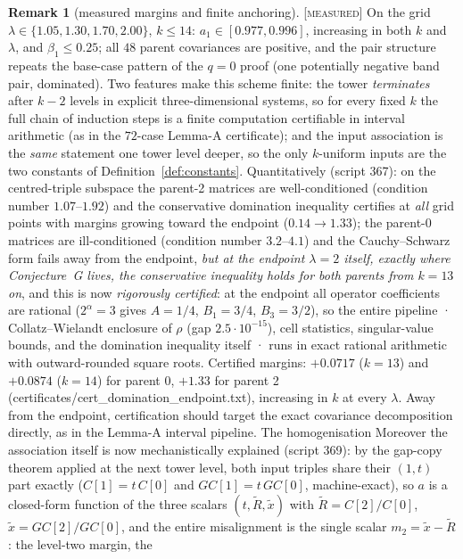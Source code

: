 \documentclass[11pt]{article}
\theoremstyle{definition}
\newtheorem{remark}[theorem]{Remark}
\newcommand{\MEASURED}{\textup{[\textsc{measured}]}}
\newcommand{\lam}{\lambda}
\begin{document}
\begin{remark}[measured margins and finite anchoring]\label{rem:anchoring}
\MEASURED{} On the grid $\lam \in \{1.05, 1.30, 1.70, 2.00\}$,
$k \le 14$: $a_1 \in [0.977, 0.996]$, increasing in both $k$ and $\lam$, and
$\beta_1 \le 0.25$; all $48$ parent covariances are positive, and the
pair structure repeats the base-case pattern of the $q=0$ proof (one
potentially negative band pair, dominated). Two features make this scheme
finite: the tower \emph{terminates} after $k-2$ levels in explicit
three-dimensional systems, so for every fixed $k$ the full chain of
induction steps is a finite computation certifiable in interval arithmetic
(as in the $72$-case Lemma-A certificate); and the input association is the
\emph{same} statement one tower level deeper, so the only $k$-uniform inputs
are the two constants of Definition~\ref{def:constants}. Quantitatively (script 367): on the centred-triple subspace the parent-2 matrices are well-conditioned (condition number $1.07$--$1.92$) and the conservative domination inequality certifies at \emph{all} grid points with margins growing toward the endpoint ($0.14 \to 1.33$); the parent-0 matrices are ill-conditioned (condition number $3.2$--$4.1$) and the Cauchy--Schwarz form fails away from the endpoint, \emph{but at the endpoint $\lam = 2$ itself, exactly where Conjecture~G lives, the conservative inequality holds for both parents from $k = 13$ on}, and this is now \emph{rigorously certified}: at the endpoint all operator coefficients are rational ($2^{\alpha} = 3$ gives $A = 1/4$, $B_1 = 3/4$, $B_3 = 3/2$), so the entire pipeline · Collatz--Wielandt enclosure of $\rho$ (gap $2.5 \cdot 10^{-15}$), cell statistics, singular-value bounds, and the domination inequality itself · runs in exact rational arithmetic with outward-rounded square roots. Certified margins: $+0.0717$ ($k=13$) and $+0.0874$ ($k=14$) for parent 0, $+1.33$ for parent 2 (certificates/cert\_domination\_endpoint.txt), increasing in $k$ at every $\lam$. Away from the endpoint, certification should target the exact covariance decomposition directly, as in the Lemma-A interval pipeline. The homogenisation 
Moreover the association itself is now mechanistically explained
(script 369): by the gap-copy theorem applied at the next tower level, both
input triples share their $(1, t)$ part exactly ($C[1] = t\,C[0]$ and
$GC[1] = t\,GC[0]$, machine-exact), so $a$ is a closed-form function of the
three scalars $(t, \tilde R, \tilde x)$ with
$\tilde R = C[2]/C[0]$, $\tilde x = GC[2]/GC[0]$, and the entire misalignment
is the single scalar $m_2 = \tilde x - \tilde R$: the level-two margin, the

\end{remark}
\end{document}
